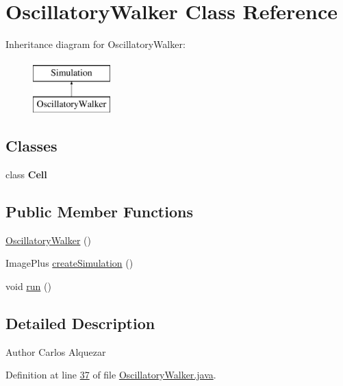 \hypertarget{classdata_1_1_oscillatory_walker}{}\section{Oscillatory\+Walker Class Reference}
\label{classdata_1_1_oscillatory_walker}
Inheritance diagram for Oscillatory\+Walker\+:\begin{figure}[H]
\begin{center}
\leavevmode
\includegraphics[height=2.000000cm]{classdata_1_1_oscillatory_walker}
\end{center}
\end{figure}
\subsection*{Classes}
\begin{DoxyCompactItemize}
\item 
class {\bfseries Cell}
\end{DoxyCompactItemize}
\subsection*{Public Member Functions}
\begin{DoxyCompactItemize}
\item 
\hyperlink{classdata_1_1_oscillatory_walker_ad2f07a526bf7192224e41a93355496ee}{Oscillatory\+Walker} ()
\item 
Image\+Plus \hyperlink{classdata_1_1_oscillatory_walker_ad015489397f3b1157e02d08913211ee4}{create\+Simulation} ()
\item 
void \hyperlink{classdata_1_1_oscillatory_walker_a13a43e6d814de94978c515cb084873b1}{run} ()
\end{DoxyCompactItemize}


\subsection{Detailed Description}
\begin{DoxyAuthor}{Author}
Carlos Alquezar 
\end{DoxyAuthor}


Definition at line \hyperlink{_oscillatory_walker_8java_source_l00037}{37} of file \hyperlink{_oscillatory_walker_8java_source}{Oscillatory\+Walker.\+java}.



